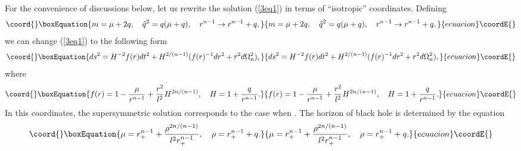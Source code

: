 \documentclass[a4paper,12pt]{article}
\begin{document}
For the convenience of discussions below, let us rewrite the solution 
(\ref{3eq1}) in terms of ``isotropic'' coordinates. Defining 
\begin{equation}\coord{}\boxEquation{
m = \mu + 2q, \ \ \  \tilde q^2 =q(\mu +q), \ \ \ r^{n-1} \to r^{n-1}+q,
}{
m = \mu + 2q, \ \ \  \tilde q^2 =q(\mu +q), \ \ \ r^{n-1} \to r^{n-1}+q,
}{ecuacion}\coordE{}\end{equation}
we can change (\ref{3eq1}) to the following form   
\begin{equation}\coord{}\boxEquation{
\label{req5}
ds^2 = H^{-2} f(r) dt^2 + H^{2/(n-1)}(f(r)^{-1}dr^2 +r^2 d\Omega_n^2),
}{
ds^2 = H^{-2} f(r) dt^2 + H^{2/(n-1)}(f(r)^{-1}dr^2 +r^2 d\Omega_n^2),
}{ecuacion}\coordE{}\end{equation}
where 
\begin{equation}\coord{}\boxEquation{
f(r) = 1-\frac{\mu}{r^{n-1}} +\frac{r^2}{l^2}H^{2n/(n-1)}, \ \ \
  H=1+\frac{q}{r^{n-1}}.
}{
f(r) = 1-\frac{\mu}{r^{n-1}} +\frac{r^2}{l^2}H^{2n/(n-1)}, \ \ \
  H=1+\frac{q}{r^{n-1}}.
}{ecuacion}\coordE{}\end{equation}
In this coordinates, the supersymmetric solution corresponds to the case 
when \myHighlight{$\mu =0$}\coordHE{}.  The horizon \coordHE{} of black hole is determined by the equation
\begin{equation}\coord{}\boxEquation{
 \mu = r_+^{n-1} +\frac{\rho ^{2n/(n-1)}}{l^2 r_+^{n-1}}, \ \ \ 
 \rho =r_+^{n-1} +q.
}{
 \mu = r_+^{n-1} +\frac{\rho ^{2n/(n-1)}}{l^2 r_+^{n-1}}, \ \ \ 
 \rho =r_+^{n-1} +q.
}{ecuacion}\coordE{}\end{equation}
\end{document}
